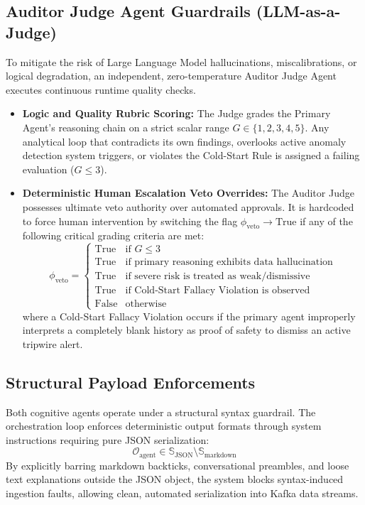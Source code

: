 \documentclass[12pt]{report}
\begin{document}
\subsection{Auditor Judge Agent Guardrails (LLM-as-a-Judge)}
To mitigate the risk of Large Language Model hallucinations, miscalibrations, or logical degradation, an independent, zero-temperature Auditor Judge Agent executes continuous runtime quality checks.

\begin{itemize}

    \item \textbf{Logic and Quality Rubric Scoring:} The Judge grades the Primary Agent's reasoning chain on a strict scalar range $G \in \{1, 2, 3, 4, 5\}$. Any analytical loop that contradicts its own findings, overlooks active anomaly detection system triggers, or violates the Cold-Start Rule is assigned a failing evaluation ($G \le 3$).
    \item \textbf{Deterministic Human Escalation Veto Overrides:} The Auditor Judge possesses ultimate veto authority over automated approvals. It is hardcoded to force human intervention by switching the flag $\phi_{\text{veto}} \rightarrow \text{True}$ if any of the following critical grading criteria are met:
    $$
        \phi_{\text{veto}} = 
        \begin{cases} 
            \text{True} & \text{if } G \le 3 \\
            \text{True} & \text{if primary reasoning exhibits data hallucination} \\
            \text{True} & \text{if severe risk is treated as weak/dismissive} \\
            \text{True} & \text{if Cold-Start Fallacy Violation is observed} \\
            \text{False} & \text{otherwise}
        \end{cases}
    $$
    where a Cold-Start Fallacy Violation occurs if the primary agent improperly interprets a completely blank history as proof of safety to dismiss an active tripwire alert.
    
\end{itemize}

\subsection{Structural Payload Enforcements}
Both cognitive agents operate under a structural syntax guardrail. The orchestration loop enforces deterministic output formats through system instructions requiring pure JSON serialization:
$$
    \mathcal{O}_{\text{agent}} \in \mathbb{S}_{\text{JSON}} \setminus \mathbb{S}_{\text{markdown}}
$$
By explicitly barring markdown backticks, conversational preambles, and loose text explanations outside the JSON object, the system blocks syntax-induced ingestion faults, allowing clean, automated serialization into Kafka data streams.
\end{document}

